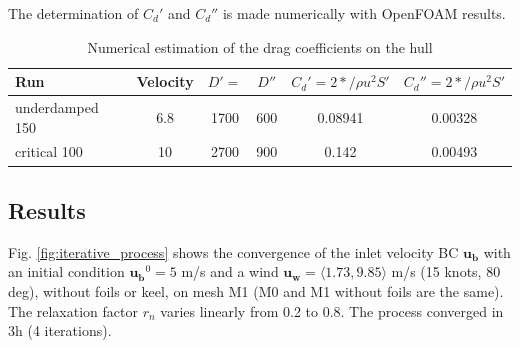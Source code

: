     The determination of $C_d'$ and $C_d''$ is made numerically with OpenFOAM results. 

    \begin{table}[ht!]
        \centering
        \begin{tabular}{p{4cm}|c|c|c|c|c}
            Run & Velocity & $D'=$ & $D''$ & $C_d'=2*/\rho u^2 S'$ & $C_d''=2*/\rho u^2 S'$ \\
            \hline  
            underdamped 150 & 6.8 & 1700 & 600 & 0.08941 & 0.00328 \\
            critical 100 & 10 & 2700 & 900 & 0.142 & 0.00493 \\
        \end{tabular}
        \caption{Numerical estimation of the drag coefficients on the hull}
        \label{tab:dragCoeffHull}
    \end{table}


\clearpage
\subsection{Results}
    Fig. \ref{fig:iterative_process} shows the convergence of the inlet velocity BC $\mathbf{u_b}$ with an initial condition $\mathbf{u_b}^0 = 5$ m/s and a wind $\mathbf{u_w} = \langle 1.73, 9.85\rangle$ m/s (15 knots, 80 deg), without foils or keel, on mesh M1 (M0 and M1 without foils are the same). The relaxation factor $r_n$ varies linearly from 0.2 to 0.8. The process converged in 3h (4 iterations). 

